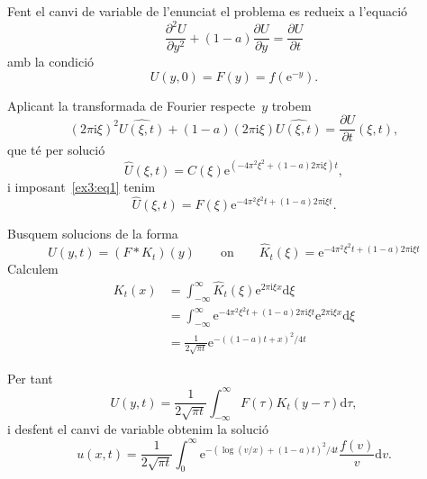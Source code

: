 \documentclass[a4paper]{article}
\theoremstyle{plain}
\theoremstyle{definition}
\newcommand{\iu}{\mathrm{i}}
\newcommand{\e}{\mathrm{e}}
\providecommand{\uppi}{\pi}
\newcommand{\diff}{\mathrm{d}}
\begin{document}
Fent el canvi de variable de l'enunciat el problema es redueix a l'equació
\[
    \frac{\partial^{2} U}{\partial y^{2}}
    +
    (1 - a)
    \frac{\partial U}{\partial y}
    =
    \frac{\partial U}{\partial t}
\]
amb la condició
\begin{equation}
    \label{ex3:eq1}
    U(y,0) = F(y) = f(\e^{-y}).
\end{equation}

Aplicant la transformada de Fourier respecte~\(y\) trobem
\[
    (2\uppi\iu\xi)^{2}
    \widehat{U(\xi,t)}
    +
    (1 - a)
    (2\uppi\iu\xi)
    \widehat{U(\xi,t)}
    =
    \frac{\partial U}{\partial t}
    (\xi,t),
\]
que té per solució
\[
    \widehat{U}(\xi,t)
    =
    C(\xi)
    \e^{(-4\uppi^{2}\xi^{2}+(1-a)2\uppi\iu\xi)t},
\]
i imposant~\eqref{ex3:eq1} tenim
\[
    \widehat{U}(\xi,t)
    =
    F(\xi)
    \e^{-4\uppi^{2}\xi^{2}t+(1-a)2\uppi\iu\xi t}.
\]

Busquem solucions de la forma
\[
    U(y,t)
    =
    (F\ast K_{t})(y)
    \qquad\text{on}\qquad
    \widehat{K}_{t}(\xi)
    =
    \e^{-4\uppi^{2}\xi^{2}t+(1-a)2\uppi\iu\xi t}
\]
Calculem
\begin{align*}
    K_{t}(x) &= \int_{-\infty}^{\infty}
                \widehat{K}_{t}(\xi)
                \e^{2\uppi\iu\xi x}
                \diff\xi \\
             &= \int_{-\infty}^{\infty}
                \e^{-4\uppi^{2}\xi^{2}t+(1-a)2\uppi\iu\xi t}
                \e^{2\uppi\iu\xi x}
                \diff\xi \\
             &= \frac{1}{2\sqrt{\uppi t}}
             \e^{-{((1-a)t+x)^{2}}/{4t}}
\end{align*}

Per tant
\[
    U(y,t)
    =
    \frac{1}{2\sqrt{\uppi t}}
    \int_{-\infty}^{\infty}
    F(\tau)K_{t}
    (y-\tau)
    \diff\tau,
\]
i desfent el canvi de variable obtenim la solució
\[
    u(x,t)
    =
    \frac{1}{2\sqrt{\uppi t}}
    \int_{0}^{\infty}
    \e^{-(\log(v/x)+(1-a)t)^{2}/4t}
    \frac{f(v)}{v}
    \diff v.
\]
\end{document}
